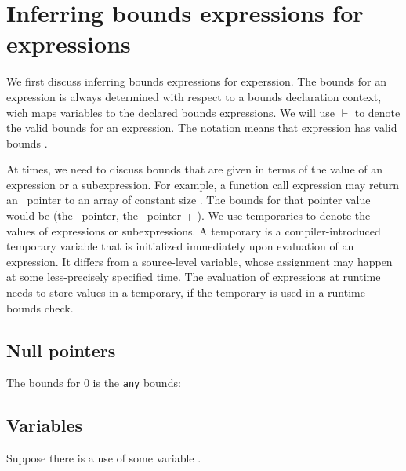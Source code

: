\section{Inferring bounds expressions for expressions}
\label{section:inferring-expression-bounds}

We first discuss inferring bounds expressions for experssion. The bounds for an
expression is always determined with respect to a bounds
declaration context, wich maps variables to the declared bounds
expressions.  We will use $\vdash$ to denote the
valid bounds for an expression. The notation 
means that expression  has valid bounds .

At times, we need to discuss bounds that are given in terms of the value
of an expression or a subexpression.   For example, a function call expression may
return an \arrayptr\ pointer to an array of constant size
. The bounds for that pointer value would be (the
\arrayptr\ pointer, the \arrayptr\ pointer +
). We use temporaries to denote the values
of expressions or subexpressions.   A temporary is a compiler-introduced
temporary variable that is initialized immediately upon evaluation of an
expression.   It differs from a source-level variable, whose assignment
may happen at some less-precisely specified time.   The evaluation of
expressions at runtime needs to store values in a temporary, 
if the temporary is used in a runtime
bounds check.

\subsection{Null pointers}

The bounds for 0 is the \lstinline|any| bounds:


\subsection{Variables}
\label{section:checking-variables}

Suppose there is a use of some variable .


